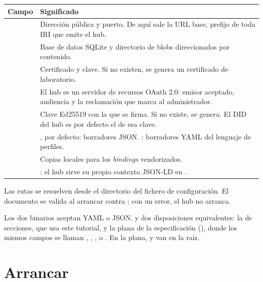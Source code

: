 \noindent\begin{tabularx}{\linewidth}{@{}L{5.3cm}Y@{}}
\toprule
\textbf{Campo} & \textbf{Significado} \\
\midrule
{} & Dirección pública y puerto. De aquí sale la URL base, prefijo de toda IRI que emite el hub. \\
 & Base de datos SQLite y directorio de blobs direccionados por contenido. \\
 & Certificado y clave. Si no existen, se genera un certificado de laboratorio. \\
 & El hub es un servidor de recursos OAuth 2.0: emisor aceptado, audiencia y la reclamación que marca al administrador. \\
 & Clave Ed25519 con la que se firma. Si no existe, se genera. El DID del hub es por defecto el  de esa clave. \\
 & , por defecto: borradores JSON. : borradores YAML del lenguaje de perfiles. \\
 & Copias locales para los \emph{bindings} vendorizados. \\
 & : el hub sirve su propio contexto JSON-LD en . \\
\bottomrule
\end{tabularx}

\medskip
Las rutas  se resuelven desde el directorio del fichero de configuración. El documento se valida al
arrancar contra ; con un error, el hub no arranca.

\begin{notaPractica}
Los dos binarios aceptan YAML o JSON, y dos disposiciones equivalentes: la de secciones, que usa este tutorial,
y la plana de la especificación (), donde los mismos campos se llaman ,
, ,  o . En la plana,  y
 van en la raíz.
\end{notaPractica}

\section{Arrancar}

